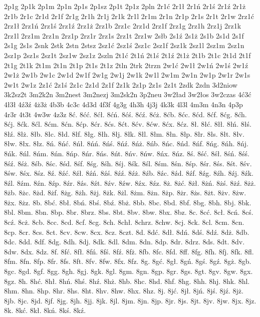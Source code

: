 {2p1g
2p1k
2p1m
2p1n
2p1s
2p1sz
2p1t
2p1z
2pln
2r1ć
2r1ł
2r1ń
2r1ś
2r1ź
2r1ż
2r1b
2r1c
2r1d
2r1f
2r1g
2r1h
2r1j
2r1k
2r1l
2r1m
2r1n
2r1p
2r1s
2r1t
2r1w
2rz1ć
2rz1ł
2rz1ń
2rz1ś
2rz1ź
2rz1ż
2rz1b
2rz1c
2rz1d
2rz1f
2rz1g
2rz1h
2rz1j
2rz1k
2rz1l
2rz1m
2rz1n
2rz1p
2rz1r
2rz1s
2rz1t
2rz1w
2słb
2s1ź
2s1ż
2s1b
2s1d
2s1f
2s1g
2s1s
2snk
2stk
2stn
2stsz
2sz1ć
2sz1ś
2sz1c
2sz1f
2sz1k
2sz1l
2sz1m
2sz1n
2sz1p
2sz1s
2sz1t
2sz1w
2sz1z
2szln
2t1ć
2t1ń
2t1ś
2t1ź
2t1ż
2t1b
2t1c
2t1d
2t1f
2t1g
2t1k
2t1m
2t1n
2t1p
2t1s
2t1z
2tln
2trk
2trzn
2w1ć
2w1ł
2w1ń
2w1ś
2w1ź
2w1ż
2w1b
2w1c
2w1d
2w1f
2w1g
2w1j
2w1k
2w1l
2w1m
2w1n
2w1p
2w1r
2w1s
2w1t
2w1z
2z1ć
2z1ś
2z1c
2z1d
2z1f
2z1k
2z1p
2z1s
2z1t
2zdk
2zdn
3d2niow
3k2sz2t
3m2k2n
3m2nest
3m2nezj
3m2sk2n
3p2neu
3w2ład
3w2łos
3w2czas
4ć3ć
4ł3ł
4ź3ź
4ż3ż
4b3b
4c3c
4d3d
4f3f
4g3g
4h3h
4j3j
4k3k
4l3l
4m3m
4n3n
4p3p
4r3r
4t3t
4w3w
4z3z
8ć.
8ćć.
8ćł.
8ćń.
8ćś.
8ćź.
8ćż.
8ćb.
8ćc.
8ćd.
8ćf.
8ćg.
8ćh.
8ćj.
8ćk.
8ćl.
8ćm.
8ćn.
8ćp.
8ćr.
8ćs.
8ćt.
8ćv.
8ćw.
8ćx.
8ćz.
8ł.
8łć.
8łł.
8łń.
8łś.
8łź.
8łż.
8łb.
8łc.
8łd.
8łf.
8łg.
8łh.
8łj.
8łk.
8łl.
8łm.
8łn.
8łp.
8łr.
8łs.
8łt.
8łv.
8łw.
8łx.
8łz.
8ń.
8ńć.
8ńł.
8ńń.
8ńś.
8ńź.
8ńż.
8ńb.
8ńc.
8ńd.
8ńf.
8ńg.
8ńh.
8ńj.
8ńk.
8ńl.
8ńm.
8ńn.
8ńp.
8ńr.
8ńs.
8ńt.
8ńv.
8ńw.
8ńx.
8ńz.
8ś.
8ść.
8śł.
8śń.
8śś.
8śź.
8śż.
8śb.
8śc.
8śd.
8śf.
8śg.
8śh.
8śj.
8śk.
8śl.
8śm.
8śn.
8śp.
8śr.
8śs.
8śt.
8śv.
8św.
8śx.
8śz.
8ź.
8źć.
8źł.
8źń.
8źś.
8źź.
8źż.
8źb.
8źc.
8źd.
8źf.
8źg.
8źh.
8źj.
8źk.
8źl.
8źm.
8źn.
8źp.
8źr.
8źs.
8źt.
8źv.
8źw.
8źx.
8źz.
8ż.
8żć.
8żł.
8żń.
8żś.
8żź.
8żż.
8żb.
8żc.
8żd.
8żf.
8żg.
8żh.
8żj.
8żk.
8żl.
8żm.
8żn.
8żp.
8żr.
8żs.
8żt.
8żv.
8żw.
8żx.
8żz.
8b.
8bć.
8bł.
8bń.
8bś.
8bź.
8bż.
8bb.
8bc.
8bd.
8bf.
8bg.
8bh.
8bj.
8bk.
8bl.
8bm.
8bn.
8bp.
8br.
8brz.
8bs.
8bt.
8bv.
8bw.
8bx.
8bz.
8c.
8cć.
8cł.
8cń.
8cś.
8cź.
8cż.
8cb.
8cc.
8cd.
8cf.
8cg.
8ch.
8chł.
8chrz.
8chw.
8cj.
8ck.
8cl.
8cm.
8cn.
8cp.
8cr.
8cs.
8ct.
8cv.
8cw.
8cx.
8cz.
8czt.
8d.
8dć.
8dł.
8dń.
8dś.
8dź.
8dż.
8db.
8dc.
8dd.
8df.
8dg.
8dh.
8dj.
8dk.
8dl.
8dm.
8dn.
8dp.
8dr.
8drz.
8ds.
8dt.
8dv.
8dw.
8dx.
8dz.
8f.
8fć.
8fł.
8fń.
8fś.
8fź.
8fż.
8fb.
8fc.
8fd.
8ff.
8fg.
8fh.
8fj.
8fk.
8fl.
8fm.
8fn.
8fp.
8fr.
8fs.
8ft.
8fv.
8fw.
8fx.
8fz.
8g.
8gć.
8gł.
8gń.
8gś.
8gź.
8gż.
8gb.
8gc.
8gd.
8gf.
8gg.
8gh.
8gj.
8gk.
8gl.
8gm.
8gn.
8gp.
8gr.
8gs.
8gt.
8gv.
8gw.
8gx.
8gz.
8h.
8hć.
8hł.
8hń.
8hś.
8hź.
8hż.
8hb.
8hc.
8hd.
8hf.
8hg.
8hh.
8hj.
8hk.
8hl.
8hm.
8hn.
8hp.
8hr.
8hs.
8ht.
8hv.
8hw.
8hx.
8hz.
8j.
8jć.
8jł.
8jń.
8jś.
8jź.
8jż.
8jb.
8jc.
8jd.
8jf.
8jg.
8jh.
8jj.
8jk.
8jl.
8jm.
8jn.
8jp.
8jr.
8js.
8jt.
8jv.
8jw.
8jx.
8jz.
8k.
8kć.
8kł.
8kń.
8kś.
8kź.
}
